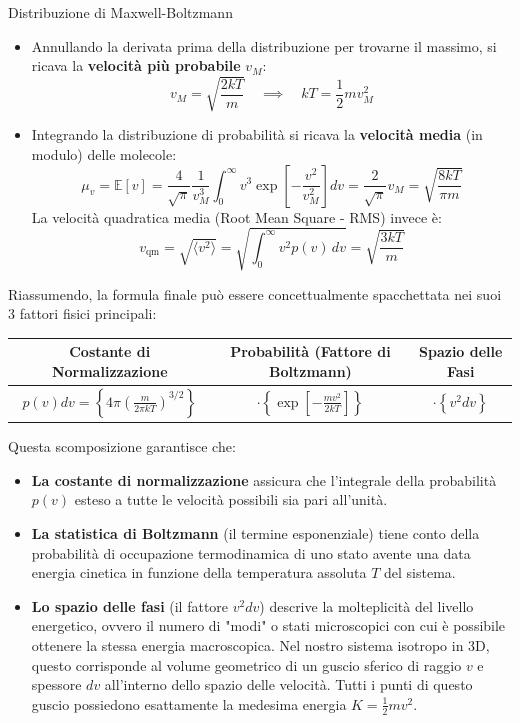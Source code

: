 \documentclass[openany,a4paper,12pt]{book}
\theoremstyle{remark}
\begin{document}
\begin{bressan}{Distribuzione di Maxwell-Boltzmann}
\begin{itemize}
    \item Annullando la derivata prima della distribuzione per trovarne il massimo, si ricava la \textbf{velocità più probabile} $v_M$:
    \[
        v_M = \sqrt{\frac{2kT}{m}} \quad \implies \quad kT = \frac{1}{2}m v_M^2
    \]
    
    \item Integrando la distribuzione di probabilità si ricava la \textbf{velocità media} (in modulo) delle molecole:
    \[
        \mu_v = \mathbb{E}[v] = \frac{4}{\sqrt{\pi}} \frac{1}{v_M^3} \int_0^\infty v^3 \exp\left[-\frac{v^2}{v_M^2}\right] dv = \frac{2}{\sqrt{\pi}} v_M = \sqrt{\frac{8kT}{\pi m}}
    \]
    La velocità quadratica media (Root Mean Square - RMS) invece è:
    \[
        v_{\text{qm}} = \sqrt{\langle v^2 \rangle} = \sqrt{\int_0^\infty v^2 p(v) \, dv} = \sqrt{\frac{3kT}{m}}
    \]
\end{itemize}

\vspace{1em}
Riassumendo, la formula finale può essere concettualmente spacchettata nei suoi 3 fattori fisici principali:

\begin{center}
    \centering
    \begin{tabular}{ccc}
        \toprule
        Costante di Normalizzazione & Probabilità (Fattore di Boltzmann) & Spazio delle Fasi \\
        \midrule
        $p(v) dv = \displaystyle \left\{ 4\pi \left( \frac{m}{2\pi kT} \right)^{3/2} \right\}$ & $\displaystyle \cdot \left\{ \exp \left[ -\frac{mv^2}{2kT} \right] \right\}$ & $\displaystyle \cdot \left\{ v^2 dv \right\}$ \\
        \bottomrule
    \end{tabular}
\end{center}

Questa scomposizione garantisce che:
\begin{itemize}
    \item \textbf{La costante di normalizzazione} assicura che l'integrale della probabilità $p(v)$ esteso a tutte le velocità possibili sia pari all'unità.
    \item \textbf{La statistica di Boltzmann} (il termine esponenziale) tiene conto della probabilità di occupazione termodinamica di uno stato avente una data energia cinetica in funzione della temperatura assoluta $T$ del sistema.
    \item \textbf{Lo spazio delle fasi} (il fattore $v^2 dv$) descrive la molteplicità del livello energetico, ovvero il numero di "modi" o stati microscopici con cui è possibile ottenere la stessa energia macroscopica. Nel nostro sistema isotropo in 3D, questo corrisponde al volume geometrico di un guscio sferico di raggio $v$ e spessore $dv$ all'interno dello spazio delle velocità. Tutti i punti di questo guscio possiedono esattamente la medesima energia $K = \frac{1}{2}mv^2$.
\end{itemize}
\end{bressan}
\end{document}
